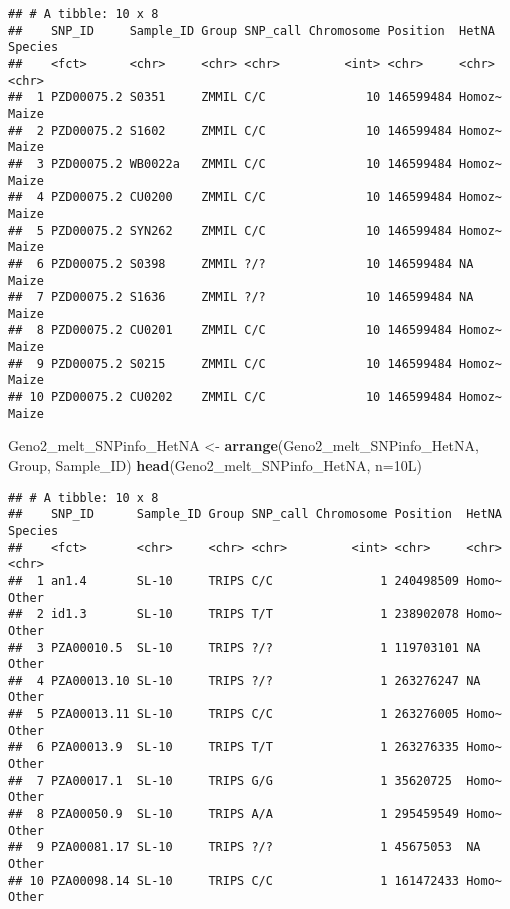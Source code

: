 \documentclass[]{article}
\newenvironment{Shaded}{\begin{snugshade}}{\end{snugshade}}
\newcommand{\KeywordTok}[1]{\textcolor[rgb]{0.13,0.29,0.53}{\textbf{#1}}}
\newcommand{\DataTypeTok}[1]{\textcolor[rgb]{0.13,0.29,0.53}{#1}}
\newcommand{\StringTok}[1]{\textcolor[rgb]{0.31,0.60,0.02}{#1}}
\newcommand{\NormalTok}[1]{#1}
\begin{document}
\begin{verbatim}
## # A tibble: 10 x 8
##    SNP_ID     Sample_ID Group SNP_call Chromosome Position  HetNA  Species
##    <fct>      <chr>     <chr> <chr>         <int> <chr>     <chr>  <chr>  
##  1 PZD00075.2 S0351     ZMMIL C/C              10 146599484 Homoz~ Maize  
##  2 PZD00075.2 S1602     ZMMIL C/C              10 146599484 Homoz~ Maize  
##  3 PZD00075.2 WB0022a   ZMMIL C/C              10 146599484 Homoz~ Maize  
##  4 PZD00075.2 CU0200    ZMMIL C/C              10 146599484 Homoz~ Maize  
##  5 PZD00075.2 SYN262    ZMMIL C/C              10 146599484 Homoz~ Maize  
##  6 PZD00075.2 S0398     ZMMIL ?/?              10 146599484 NA     Maize  
##  7 PZD00075.2 S1636     ZMMIL ?/?              10 146599484 NA     Maize  
##  8 PZD00075.2 CU0201    ZMMIL C/C              10 146599484 Homoz~ Maize  
##  9 PZD00075.2 S0215     ZMMIL C/C              10 146599484 Homoz~ Maize  
## 10 PZD00075.2 CU0202    ZMMIL C/C              10 146599484 Homoz~ Maize
\end{verbatim}

\begin{Shaded}
\begin{Highlighting}[]
\NormalTok{Geno2_melt_SNPinfo_HetNA <-}\StringTok{ }\KeywordTok{arrange}\NormalTok{(Geno2_melt_SNPinfo_HetNA, Group, Sample_ID)}
\KeywordTok{head}\NormalTok{(Geno2_melt_SNPinfo_HetNA, }\DataTypeTok{n=}\NormalTok{10L)}
\end{Highlighting}
\end{Shaded}

\begin{verbatim}
## # A tibble: 10 x 8
##    SNP_ID      Sample_ID Group SNP_call Chromosome Position  HetNA Species
##    <fct>       <chr>     <chr> <chr>         <int> <chr>     <chr> <chr>  
##  1 an1.4       SL-10     TRIPS C/C               1 240498509 Homo~ Other  
##  2 id1.3       SL-10     TRIPS T/T               1 238902078 Homo~ Other  
##  3 PZA00010.5  SL-10     TRIPS ?/?               1 119703101 NA    Other  
##  4 PZA00013.10 SL-10     TRIPS ?/?               1 263276247 NA    Other  
##  5 PZA00013.11 SL-10     TRIPS C/C               1 263276005 Homo~ Other  
##  6 PZA00013.9  SL-10     TRIPS T/T               1 263276335 Homo~ Other  
##  7 PZA00017.1  SL-10     TRIPS G/G               1 35620725  Homo~ Other  
##  8 PZA00050.9  SL-10     TRIPS A/A               1 295459549 Homo~ Other  
##  9 PZA00081.17 SL-10     TRIPS ?/?               1 45675053  NA    Other  
## 10 PZA00098.14 SL-10     TRIPS C/C               1 161472433 Homo~ Other
\end{verbatim}
\end{document}
